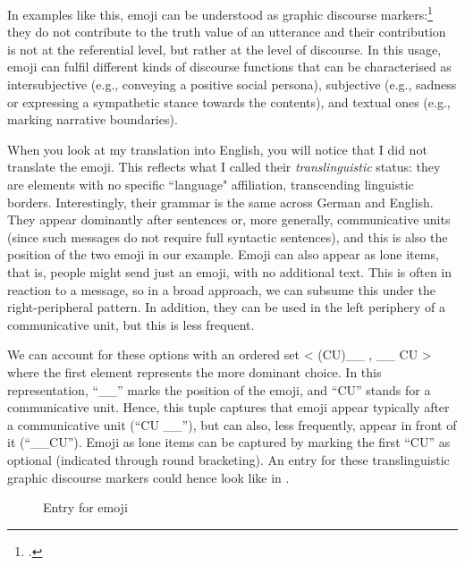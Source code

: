 In examples like this, emoji can be understood as graphic discourse markers:\footnote{\citet{WieseLabrenz2021}.} they do not contribute to the truth value of an utterance and their contribution is not at the referential level, but rather at the level of discourse. In this usage, emoji can fulfil different kinds of discourse functions that can be characterised as intersubjective (e.g., conveying a positive social persona), subjective (e.g., sadness or expressing a sympathetic stance towards the contents), and textual ones (e.g., marking narrative boundaries).

When you look at my translation into English, you will notice that I did not translate the emoji. This reflects what I called their \textit{translinguistic} status: they are elements with no specific “language" affiliation, transcending linguistic borders. Interestingly, their grammar is the same across German and English. They appear dominantly after sentences or, more generally, communicative units (since such messages do not require full syntactic sentences), and this is also the position of the two emoji in our example. Emoji can also appear as lone items, that is, people might send just an emoji, with no additional text. This is often in reaction to a message, so in a broad approach, we can subsume this under the right-peripheral pattern. In addition, they can be used in the left periphery of a communicative unit, but this is less frequent.

We can account for these options with an ordered set < (CU)\_\_ ,  \_\_ CU > where the first element represents the more dominant choice. In this representation, “\_\_” marks the position of the emoji, and “CU” stands for a communicative unit. Hence, this tuple captures that emoji appear typically after a communicative unit (“CU \_\_”), but can also, less frequently, appear in front of it (“\_\_CU”). Emoji as lone items can be captured by marking the first “CU” as optional (indicated through round bracketing). An entry for these translinguistic graphic discourse markers could hence look like in .

\begin{figure}
\caption{\label{fig:14} Entry for emoji}
\end{figure}

